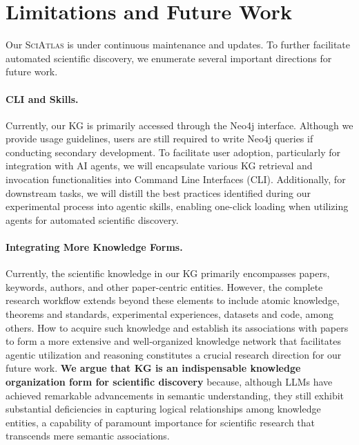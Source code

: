 \documentclass{llmxive}
\providecommand{\ours}{\textsc{SciAtlas}}
\begin{document}
\section{Limitations and Future Work}
Our {\ours} is under continuous maintenance and updates.
To further facilitate automated scientific discovery, we enumerate several important directions for future work.

\paragraph{CLI and Skills.}
Currently, our KG is primarily accessed through the Neo4j interface.
Although we provide usage guidelines, users are still required to write Neo4j queries if conducting secondary development.
To facilitate user adoption, particularly for integration with AI agents, we will encapsulate various KG retrieval and invocation functionalities into Command Line Interfaces (CLI).
 Additionally, for downstream tasks, we will distill the best practices identified during our experimental process into agentic skills, enabling one-click loading when utilizing agents for automated scientific discovery.

\paragraph{Integrating More Knowledge Forms.}
Currently, the scientific knowledge in our KG primarily encompasses papers, keywords, authors, and other paper-centric entities.
However, the complete research workflow extends beyond these elements to include atomic knowledge, theorems and standards, experimental experiences, datasets and code, among others.
How to acquire such knowledge and establish its associations with papers to form a more extensive and well-organized knowledge network that facilitates agentic utilization and reasoning constitutes a crucial research direction for our future work.
\textbf{We argue that KG is an indispensable knowledge organization form for scientific discovery} because, although LLMs have achieved remarkable advancements in semantic understanding, they still exhibit substantial deficiencies in capturing logical relationships among knowledge entities, a capability of paramount importance for scientific research that transcends mere semantic associations.
\end{document}

